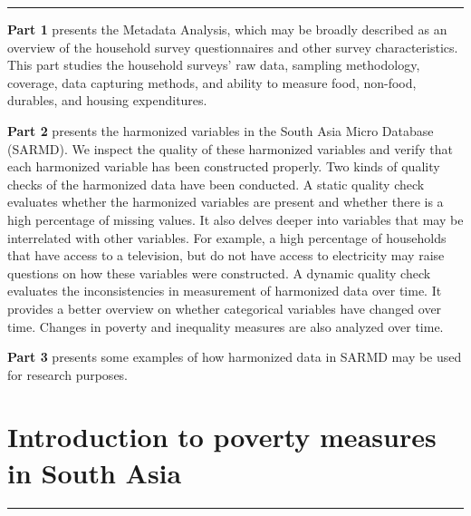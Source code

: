 \documentclass[13 pt,]{book}
\begin{document}
\begin{center}\rule{0.5\linewidth}{\linethickness}\end{center}

\textbf{Part 1} presents the Metadata Analysis, which may be broadly
described as an overview of the household survey questionnaires and
other survey characteristics. This part studies the household surveys'
raw data, sampling methodology, coverage, data capturing methods, and
ability to measure food, non-food, durables, and housing expenditures.

\textbf{Part 2} presents the harmonized variables in the South Asia
Micro Database (SARMD). We inspect the quality of these harmonized
variables and verify that each harmonized variable has been constructed
properly. Two kinds of quality checks of the harmonized data have been
conducted. A static quality check evaluates whether the harmonized
variables are present and whether there is a high percentage of missing
values. It also delves deeper into variables that may be interrelated
with other variables. For example, a high percentage of households that
have access to a television, but do not have access to electricity may
raise questions on how these variables were constructed. A dynamic
quality check evaluates the inconsistencies in measurement of harmonized
data over time. It provides a better overview on whether categorical
variables have changed over time. Changes in poverty and inequality
measures are also analyzed over time.

\textbf{Part 3} presents some examples of how harmonized data in SARMD
may be used for research purposes.

\chapter{Introduction to poverty measures in South
Asia}\label{introduction-to-poverty-measures-in-south-asia}

\begin{center}\rule{0.5\linewidth}{\linethickness}\end{center}
\end{document}
